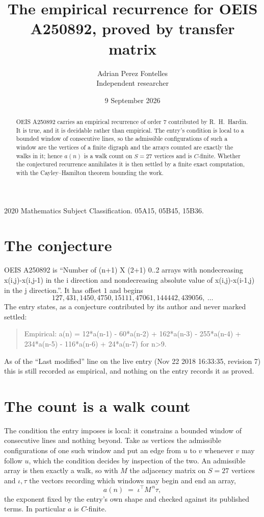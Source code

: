 \documentclass[11pt,a4paper]{article}
\title{The empirical recurrence for OEIS A250892, proved by transfer matrix}
\author{Adrian Perez Fontelles\\ \small Independent researcher}
\date{9 September 2026}
\theoremstyle{plain}
\theoremstyle{definition}
\begin{document}
\maketitle

\begin{abstract}
OEIS A250892 carries an empirical recurrence of order $7$ contributed by R.~H.~Hardin. It is
true, and it is decidable rather than empirical. The entry's condition is local to a bounded window of consecutive lines, so
the admissible configurations of such a window are the vertices of a finite digraph and the
arrays counted are exactly the walks in it; hence $a(n)$ is a walk count on $S=27$ vertices
and is $C$-finite. Whether the conjectured recurrence annihilates it is then settled by a
finite exact computation, with the Cayley--Hamilton theorem bounding the work.
\end{abstract}

\noindent\small 2020 Mathematics Subject Classification. 05A15, 05B45, 15B36.\normalsize

\section{The conjecture}

OEIS A250892 is ``Number of (n+1) X (2+1) 0..2 arrays with nondecreasing x(i,j)-x(i,j-1) in the i direction and nondecreasing absolute value of x(i,j)-x(i-1,j) in the j direction.''. It has offset $1$ and begins
\[
127, 431, 1450, 4750, 15111, 47061, 144442, 439056,\ \dots
\]
The entry states, as a conjecture contributed by its author and never marked settled:
\begin{quote}
Empirical: a(n) = 12*a(n-1) - 60*a(n-2) + 162*a(n-3) - 255*a(n-4) + 234*a(n-5) - 116*a(n-6) + 24*a(n-7) for n>9.
\end{quote}
As of the ``Last modified'' line on the live entry (Nov 22 2018 16:33:35, revision 7) this is still
recorded as empirical, and nothing on the entry records it as proved.

\section{The count is a walk count}

The condition the entry imposes is local: it constrains a bounded window of consecutive lines and nothing beyond. Take as
vertices the admissible configurations of one such window and put an edge from $u$ to $v$
whenever $v$ may follow $u$, which the condition decides by inspection of the two. An
admissible array is then exactly a walk, so with $M$ the adjacency matrix on $S=27$ vertices
and $\iota,\tau$ the vectors recording which windows may begin and end an array,
\[
a(n)\;=\;\iota^{\!\top}M^{\,n}\tau ,
\]
the exponent fixed by the entry's own shape and checked against its published terms. In
particular $a$ is $C$-finite.
\end{document}
